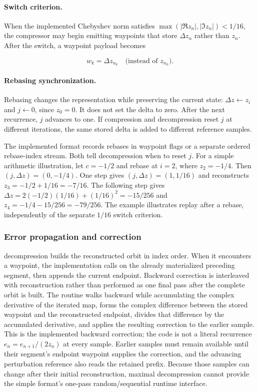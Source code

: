\paragraph{Switch criterion.}
When the implemented Chebyshev norm satisfies
$\max(|\Re z_n|,|\Im z_n|)<1/16$, the compressor may begin emitting waypoints
that store \(\Delta z_n\) rather than \(z_n\).  After the switch, a waypoint
payload becomes

\begin{equation}
  w_k = \Delta z_{n_k} \quad\text{(instead of } z_{n_k}\text{)}.
  \label{eq:pert-waypoint-payload}
\end{equation}

\paragraph{Rebasing synchronization.}
Rebasing changes the representation while preserving the current state:
$\Delta z\leftarrow z_i$ and $j\leftarrow0$, since $z_0=0$.
It does not set the delta to zero.  After the next recurrence, $j$ advances
to one.  If compression and decompression reset $j$ at different iterations,
the same stored delta is added to different reference samples.

The implemented format records rebases in waypoint flags or a separate ordered
rebase-index stream.  Both tell decompression when to reset $j$.
For a simple arithmetic illustration, let $c=-1/2$ and rebase at $i=2$,
where $z_2=-1/4$.  Then $(j,\Delta z)=(0,-1/4)$.  One step gives
$(j,\Delta z)=(1,1/16)$ and reconstructs
$z_3=-1/2+1/16=-7/16$.  The following step gives
$\Delta z=2(-1/2)(1/16)+(1/16)^2=-15/256$ and
$z_4=-1/4-15/256=-79/256$.  The example illustrates replay after a
rebase, independently of the separate $1/16$ switch criterion.

\subsubsection{Error propagation and correction}

 decompression builds the reconstructed orbit in index order.
When it encounters a waypoint, the implementation calls 
on the already materialized preceding segment, then appends the current endpoint.
Backward correction is interleaved with reconstruction rather than performed as
one final pass after the complete orbit is built.  The routine walks backward
while accumulating the complex derivative
of the iterated map, forms the complex difference between the stored waypoint
and the reconstructed endpoint, divides that difference by the accumulated
derivative, and applies the resulting correction to the earlier sample.  This
is the implemented backward correction; the code is not a literal recurrence
$e_n=e_{n+1}/(2z_n)$ at every sample.  Earlier samples must remain available
until their segment's endpoint waypoint supplies the correction, and the
advancing perturbation reference also reads the retained prefix.  Because those
samples can change after their initial reconstruction, maximal decompression cannot provide
the simple format's one-pass random/sequential runtime interface.

